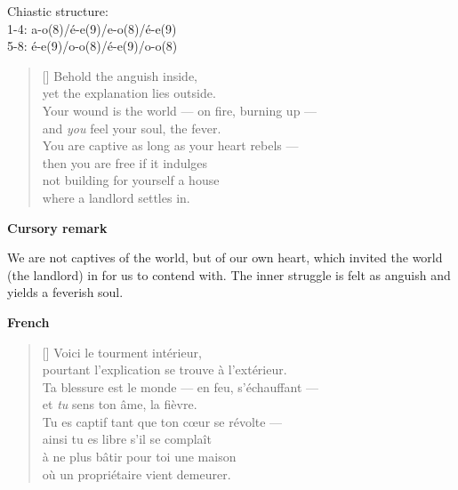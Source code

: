 \documentclass[a4paper,12pt,twoside,final]{book}
\begin{document}
\noindent Chiastic structure: \\
1-4: a-o(8)/é-e(9)/e-o(8)/é-e(9) \\
5-8: é-e(9)/o-o(8)/é-e(9)/o-o(8)

\newpage


\settowidth{\versewidth}{Your wound is the world --- on fire, burning up ---}

\begin{verse}[\versewidth]
  Behold the anguish inside, \\
  yet the explanation lies outside. \\
  Your wound is the world --- on fire, burning up --- \\
  and \emph{you} feel your soul, the fever. \\
  You are captive as long as your heart rebels --- \\
  then you are free if it indulges \\
  not building for yourself a house \\
  where a landlord settles in. \\
\end{verse}

\bigskip

\noindent \textbf{Cursory remark}

\medskip

We are not captives of the world, but of our own heart, which invited
the world (the landlord) in for us to contend with. The inner struggle
is felt as anguish and yields a feverish soul.

\bigskip

\noindent \textbf{French}


\settowidth{\versewidth}{Ta blessure est le monde --- en feu, s'échauffant ---}

\begin{verse}[\versewidth]
  Voici le tourment intérieur, \\
  pourtant l'explication se trouve à l'extérieur. \\
  Ta blessure est le monde --- en feu, s'échauffant --- \\
  et \emph{tu} sens ton âme, la fièvre. \\
  Tu es captif tant que ton cœur se révolte --- \\
  ainsi tu es libre s'il se complaît \\
  à ne plus bâtir pour toi une maison \\
  où un propriétaire vient demeurer. \\
\end{verse}
\end{document}

